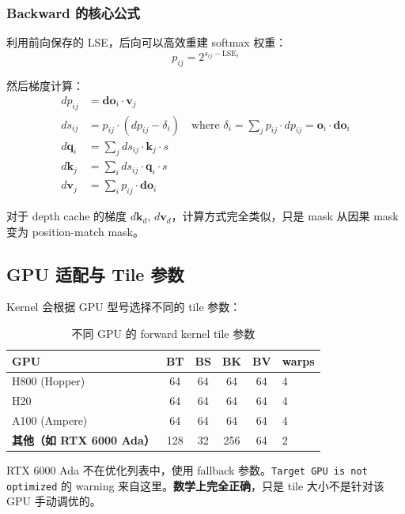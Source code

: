 \documentclass[11pt,a4paper]{article}
\begin{document}
\subsubsection{Backward 的核心公式}

利用前向保存的 LSE，后向可以高效重建 softmax 权重：
\begin{equation}
  p_{ij} = 2^{s_{ij} - \text{LSE}_i}
\end{equation}

然后梯度计算：
\begin{align}
  dp_{ij} &= \mathbf{do}_i \cdot \mathbf{v}_j \\
  ds_{ij} &= p_{ij} \cdot (dp_{ij} - \delta_i) \quad \text{where } \delta_i = \sum_j p_{ij} \cdot dp_{ij} = \mathbf{o}_i \cdot \mathbf{do}_i \\
  d\mathbf{q}_i &= \sum_j ds_{ij} \cdot \mathbf{k}_j \cdot s \\
  d\mathbf{k}_j &= \sum_i ds_{ij} \cdot \mathbf{q}_i \cdot s \\
  d\mathbf{v}_j &= \sum_i p_{ij} \cdot \mathbf{do}_i
\end{align}

对于 depth cache 的梯度 $d\mathbf{k}_d$, $d\mathbf{v}_d$，计算方式完全类似，只是 mask 从因果 mask 变为 position-match mask。

\subsection{GPU 适配与 Tile 参数}

Kernel 会根据 GPU 型号选择不同的 tile 参数：

\begin{table}[h]
\centering
\begin{tabular}{lccccl}
\toprule
GPU & BT & BS & BK & BV & warps \\
\midrule
H800 (Hopper) & 64 & 64 & 64 & 64 & 4 \\
H20 & 64 & 64 & 64 & 64 & 4 \\
A100 (Ampere) & 64 & 64 & 64 & 64 & 4 \\
\textbf{其他（如 RTX 6000 Ada）} & 128 & 32 & 256 & 64 & 2 \\
\bottomrule
\end{tabular}
\caption{不同 GPU 的 forward kernel tile 参数}
\end{table}

RTX 6000 Ada 不在优化列表中，使用 fallback 参数。\texttt{Target GPU is not optimized} 的 warning 来自这里。\textbf{数学上完全正确}，只是 tile 大小不是针对该 GPU 手动调优的。
\end{document}
